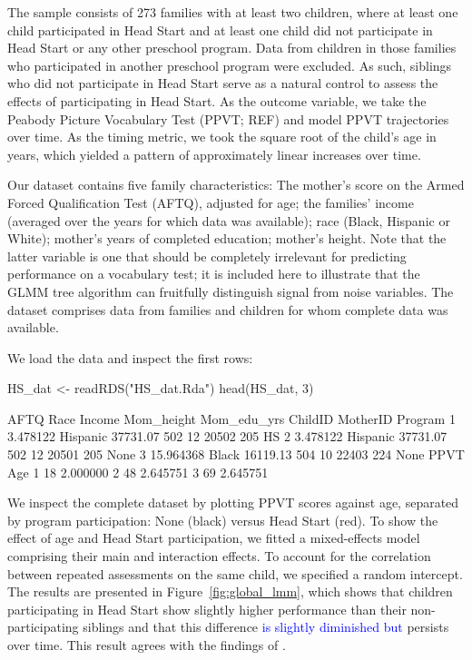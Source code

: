 \documentclass[doc,floatsintext,natbib]{apa7}
\newcommand{\edc}[1]{\textcolor{blue}{#1}}
\begin{document}
The sample consists of 273 families with at least two children, where at least one child participated in Head Start and at least one child did not participate in Head Start or any other preschool program. Data from children in those families who participated in another preschool program were excluded. As such, siblings who did not participate in Head Start serve as a natural control to assess the effects of participating in Head Start. As the outcome variable, we take the Peabody Picture Vocabulary Test (PPVT; REF) and model PPVT trajectories over time. As the timing metric, we took the square root of the child's age in years, which yielded a pattern of approximately linear increases over time.

Our dataset contains five family characteristics: The mother's score on the Armed Forced Qualification Test (AFTQ), adjusted for age; the families' income (averaged over the years for which data was available); race (Black, Hispanic or White); mother's years of completed education; mother's height. Note that the latter variable is one that should be completely irrelevant for predicting performance on a vocabulary test; it is included here to illustrate that the GLMM tree algorithm can fruitfully distinguish signal from noise variables. The dataset comprises data from families and children for whom complete data was available. 

We load the data and inspect the first rows:

\begin{Schunk}
\begin{Sinput}
 HS_dat <- readRDS("HS_dat.Rda")
 head(HS_dat, 3)
\end{Sinput}
\begin{Soutput}
       AFTQ     Race   Income Mom_height Mom_edu_yrs ChildID MotherID Program
1  3.478122 Hispanic 37731.07        502          12   20502      205      HS
2  3.478122 Hispanic 37731.07        502          12   20501      205    None
3 15.964368    Black 16119.13        504          10   22403      224    None
  PPVT      Age
1   18 2.000000
2   48 2.645751
3   69 2.645751
\end{Soutput}
\end{Schunk}

We inspect the complete dataset by plotting PPVT scores against age, separated by program participation: None (black) versus Head Start (red). To show the effect of age and Head Start participation, we fitted a mixed-effects model comprising their main and interaction effects. To account for the correlation between repeated assessments on the same child, we specified a random intercept. The results are presented in Figure~\ref{fig:global_lmm}, which shows that children participating in Head Start show slightly higher performance than their non-participating siblings and that this difference \edc{is slightly diminished but} persists over time. This result agrees with the findings of \cite{Demi09}.
\end{document}
